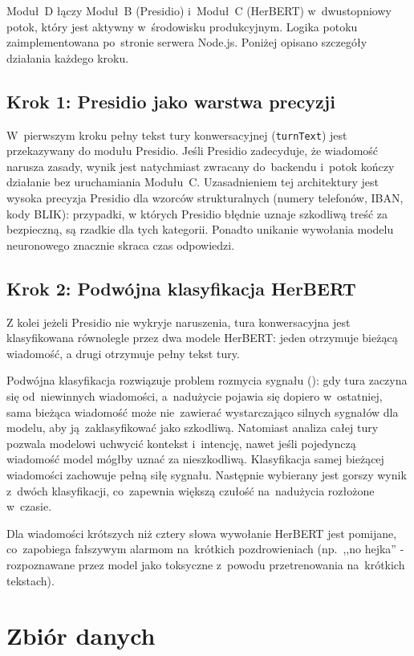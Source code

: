 Moduł~D łączy Moduł~B (Presidio) i~Moduł~C (HerBERT) w~dwustopniowy
potok, który jest aktywny w~środowisku produkcyjnym. Logika potoku
zaimplementowana po~stronie serwera Node.js. Poniżej opisano szczegóły działania każdego kroku.

\subsection{Krok 1: Presidio jako warstwa precyzji}

W~pierwszym kroku pełny tekst tury konwersacyjnej (\texttt{turnText})
jest przekazywany do modułu Presidio. Jeśli Presidio zadecyduje, że wiadomość narusza zasady, wynik jest
natychmiast zwracany do~backendu i~potok kończy działanie bez uruchamiania Modułu~C.
Uzasadnieniem tej architektury jest wysoka precyzja Presidio dla wzorców strukturalnych (numery telefonów, IBAN, kody BLIK): przypadki, w których Presidio błędnie uznaje szkodliwą treść za bezpieczną, są rzadkie dla tych kategorii. Ponadto unikanie wywołania modelu neuronowego znacznie skraca czas odpowiedzi.

\subsection{Krok 2: Podwójna klasyfikacja HerBERT}

Z kolei jeżeli Presidio nie wykryje naruszenia, tura konwersacyjna jest klasyfikowana równolegle przez dwa modele HerBERT: jeden otrzymuje bieżącą wiadomość, a drugi otrzymuje pełny tekst tury.

Podwójna klasyfikacja rozwiązuje problem rozmycia sygnału
(): gdy tura zaczyna się od~niewinnych wiadomości,
a~nadużycie pojawia się dopiero w~ostatniej, sama bieżąca wiadomość może nie~zawierać wystarczająco silnych sygnałów dla modelu, aby ją~zaklasyfikować jako szkodliwą. Natomiast analiza całej tury pozwala modelowi uchwycić kontekst i~intencję, nawet jeśli pojedynczą wiadomość model mógłby uznać za nieszkodliwą. Klasyfikacja
samej bieżącej wiadomości zachowuje pełną siłę sygnału. Następnie wybierany jest gorszy wynik z~dwóch klasyfikacji, co~zapewnia większą czułość na~nadużycia rozłożone w~czasie.

Dla wiadomości krótszych niż cztery słowa wywołanie HerBERT jest
pomijane, co~zapobiega fałszywym alarmom na~krótkich pozdrowieniach (np.\ ,,no hejka'' - rozpoznawane
przez model jako toksyczne z~powodu przetrenowania na~krótkich tekstach).


\section{Zbiór danych}
\label{sec:dataset}

